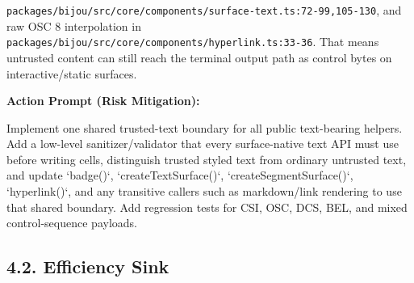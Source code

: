 \texttt{p\allowbreak{}a\allowbreak{}c\allowbreak{}k\allowbreak{}a\allowbreak{}g\allowbreak{}e\allowbreak{}s\allowbreak{}/\allowbreak{}b\allowbreak{}i\allowbreak{}j\allowbreak{}o\allowbreak{}u\allowbreak{}/\allowbreak{}s\allowbreak{}r\allowbreak{}c\allowbreak{}/\allowbreak{}c\allowbreak{}o\allowbreak{}r\allowbreak{}e\allowbreak{}/\allowbreak{}c\allowbreak{}o\allowbreak{}m\allowbreak{}p\allowbreak{}o\allowbreak{}n\allowbreak{}e\allowbreak{}n\allowbreak{}t\allowbreak{}s\allowbreak{}/\allowbreak{}s\allowbreak{}u\allowbreak{}r\allowbreak{}f\allowbreak{}a\allowbreak{}c\allowbreak{}e\allowbreak{}-\allowbreak{}t\allowbreak{}e\allowbreak{}x\allowbreak{}t\allowbreak{}.\allowbreak{}t\allowbreak{}s\allowbreak{}:\allowbreak{}7\allowbreak{}2\allowbreak{}-\allowbreak{}9\allowbreak{}9\allowbreak{},\allowbreak{}1\allowbreak{}0\allowbreak{}5\allowbreak{}-\allowbreak{}1\allowbreak{}3\allowbreak{}0}, and raw OSC 8 interpolation in \texttt{p\allowbreak{}a\allowbreak{}c\allowbreak{}k\allowbreak{}a\allowbreak{}g\allowbreak{}e\allowbreak{}s\allowbreak{}/\allowbreak{}b\allowbreak{}i\allowbreak{}j\allowbreak{}o\allowbreak{}u\allowbreak{}/\allowbreak{}s\allowbreak{}r\allowbreak{}c\allowbreak{}/\allowbreak{}c\allowbreak{}o\allowbreak{}r\allowbreak{}e\allowbreak{}/\allowbreak{}c\allowbreak{}o\allowbreak{}m\allowbreak{}p\allowbreak{}o\allowbreak{}n\allowbreak{}e\allowbreak{}n\allowbreak{}t\allowbreak{}s\allowbreak{}/\allowbreak{}h\allowbreak{}y\allowbreak{}p\allowbreak{}e\allowbreak{}r\allowbreak{}l\allowbreak{}i\allowbreak{}n\allowbreak{}k\allowbreak{}.\allowbreak{}t\allowbreak{}s\allowbreak{}:\allowbreak{}3\allowbreak{}3\allowbreak{}-\allowbreak{}3\allowbreak{}6}. That means untrusted content can still reach the terminal output path as control bytes on interactive/static surfaces.

\textbf{Action Prompt (Risk Mitigation):}

\begin{CodeBlock}
Implement one shared trusted-text boundary for all public text-bearing helpers. Add a low-level sanitizer/validator that every surface-native text API must use before writing cells, distinguish trusted styled text from ordinary untrusted text, and update `badge()`, `createTextSurface()`, `createSegmentSurface()`, `hyperlink()`, and any transitive callers such as markdown/link rendering to use that shared boundary. Add regression tests for CSI, OSC, DCS, BEL, and mixed control-sequence payloads.
\end{CodeBlock}

\subsection{4.2. Efficiency Sink}\label{record-416-efficiency-sink}

